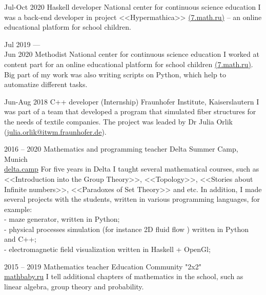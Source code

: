 \documentclass[9pt]{developercv} %
\begin{document}
\begin{entrylist}
	\entry
	{Jul-Oct 2020}
	{Haskell developer}
	{National center for continuous science education}
	{
		I was a back-end developer in project <<Hypermathica>> \href{https://7.math.ru/}{(7.math.ru)} -- an online educational platform for school children. 
	}

	\entry
	{Jul 2019 — \\Jun 2020}
	{Methodist}
	{National center for continuous science education}
	{
		I worked at content part for an online educational platform for school children \href{https://7.math.ru/}{(7.math.ru)}. Big part of my work was also writing scripts on Python, which help to automatize different tasks.
	}

	\entry
	{Jun-Aug 2018}
	{C++ developer (Internship) }
	{Fraunhofer Institute, Kaiserslautern}
	{
		I was part of a team that developed a program that simulated fiber structures for the needs of textile companies.
		The project was leaded by Dr Julia Orlik
		(\href{mailto:julia.orlik@itwm.fraunhofer.de}{julia.orlik@itwm.fraunhofer.de}).
	}
	
	\entry
		{2016 -- 2020}
		{Mathematics and programming teacher}
		{ 
		Delta Summer Camp, Munich  \\
		\null\hfill \href{https://delta.camp/}{delta.camp}	
		}
		{
		For five years in Delta I taught several mathematical courses, such as <<Introduction into the Group Theory>>, <<Topology>>, <<Stories about Infinite numbers>>, <<Paradoxes of Set Theory>> and	 etc. 		
		In addition, I made several projects with the students, written in various programming languages, for example:\\
		- maze generator, written in Python;\\
		- physical processes simulation (for instance 2D fluid flow ) written in Python and C++;\\
		- electromagnetic field visualization written in Haskell + OpenGl;
		}
	
	\entry
	{2015 -- 2019}
	{Mathematics teacher}
	{Education Community "2x2" \\
	\null\hfill \href{https://mathbaby.ru/}{mathbaby.ru}		
	 }
	{
		I tell additional chapters of mathematics in the school, such as linear algebra, group theory and probability.
	}

\end{entrylist}

\end{document}

